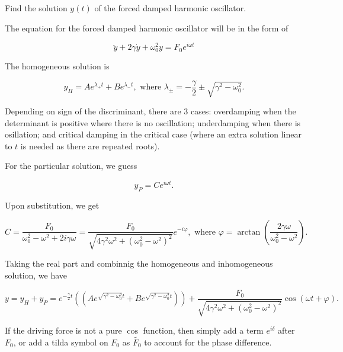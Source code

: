 \documentclass[english,a4paper,12pt]{report}
\begin{document}
{Find the solution \(y(t)\) of the forced damped harmonic oscillator.}
{The equation for the forced damped harmonic oscillator will be in the form of 

\begin{equation}
    \ddot{y} + 2\gamma \dot{y} + \omega _{0} ^2 y = F_0 e^{i \omega t}   
\end{equation}

The homogeneous solution is 

\begin{equation}
    y_{H} = Ae^{\lambda _{+} t} + Be^{\lambda _{-}t }, \text{ where } \lambda _{\pm } = -\frac{\gamma }{2} \pm \sqrt{\gamma ^2 - \omega _{0}^2 }.        
\end{equation}

Depending on sign of the discriminant, there are 3 cases: overdamping when the determinant is positive where there is no oscillation; underdamping when there is osillation; and critical damping in the critical case (where an extra solution linear to \(t\) is needed as there are repeated roots). 

For the particular solution, we guess

\begin{equation}
    y_{P} = Ce^{i \omega t}.  
\end{equation}

Upon substitution, we get

\begin{equation}
    C = \frac{F_0 }{\omega _{0}^2 -\omega ^2 + 2i\gamma \omega  } = \frac{F_0 }{\sqrt{4\gamma ^2\omega ^2+ (\omega _{0}^2 - \omega ^2)^2} }e^{-i\varphi }, \text{ where }  \varphi = \arctan \left({\frac{2\gamma \omega }{\omega _{0}^2 - \omega ^2 }}\right).    
\end{equation}

Taking the real part and combinnig the homogeneous and inhomogeneous solution, we have

\begin{equation}
    y = y_{H} + y_{P} = e^{-\frac{\gamma }{2}t } ((Ae^{ \sqrt{\gamma ^2 - \omega _{0}^2 } t } + Be^{ \sqrt{\gamma ^2 - \omega _{0}^2 } t } )) + \frac{F_0 }{\sqrt{4\gamma ^2\omega ^2+ (\omega _{0}^2 - \omega ^2 )^2} } \cos  (\omega t+\varphi ).
\end{equation}

If the driving force is not a pure \(\cos \) function, then simply add a term \(e^{i \delta } \) after \(F_0 \), or add a tilda symbol on \(F_0 \) as \(\tilde{F_0 } \) to account for the phase difference. 

}
\end{document}
